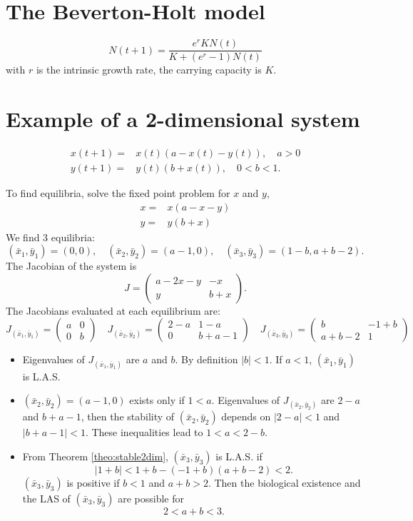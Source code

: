 \section{The Beverton-Holt model}
$$N(t+1)=\frac{ e ^r K N(t)}{K + (e^r -1)N(t)}$$
with $r$ is the intrinsic growth rate, the carrying capacity is $K$.

\section{Example of a 2-dimensional system}
\begin{equation*}
\begin{array}{cl}
x(t+1)=&x(t)(a-x(t)-y(t)), \quad a>0\\
y(t+1)=&y(t)(b+x(t)), \quad 0<b<1.
\end{array}
\end{equation*}


To find equilibria, solve the fixed point problem for $x$ and $y$,
\begin{equation*}
\begin{array}{cl}
x=&x(a-x-y)\\
y=&y(b+x)
\end{array}
\end{equation*}
We find 3 equilibria:
\[
(\bar x_1, \bar y_1)=(0,0), \quad  (\bar x_2, \bar y_2)=(a-1,0), \quad (\bar x_3, \bar y_3)=(1-b,a+b-2).
\]
The Jacobian of the system is
\[
J=\begin{pmatrix}
a-2x-y & -x \\
y & b+x
\end{pmatrix}.
\]
The Jacobians evaluated at each equilibrium are:
$$
J_{(\bar x_1, \bar y_1)}=\left ( 
\begin{array}{cc}
a & 0 \\
0 & b
\end{array}
\right ) \quad 
J_{(\bar x_2, \bar y_2)}=\left ( 
\begin{array}{cc}
2-a & 1-a \\
0 & b+a-1
\end{array}
\right ) \quad
J_{(\bar x_3, \bar y_3)}=\left ( 
\begin{array}{cc}
b & -1+b \\
a+b-2 & 1
\end{array}
\right )
$$
\begin{itemize}
\item Eigenvalues of $J_{(\bar x_1, \bar y_1)}$ are $a$ and $b$. By definition $|b|<1$. If $a<1$, $(\bar x_1, \bar y_1)$ is L.A.S.
\item $(\bar x_2, \bar y_2)=(a-1,0)$ exists only if $1<a$. Eigenvalues of $J_{(\bar x_2, \bar y_2)}$ are $2-a$ and $b+a-1$, then the stability of $(\bar x_2, \bar y_2)$ depends on $|2-a|<1$ and $|b+a-1|<1$. These inequalities lead to $1<a<2-b$.
\item From Theorem \ref{theo:stable2dim}, $(\bar x_3, \bar y_3)$ is L.A.S. if 
$$|1+b|<1+b-(-1+b)(a+b-2)<2.$$
$(\bar x_3, \bar y_3)$ is positive if $b<1$ and $a+b>2$. Then the biological existence and the LAS of $(\bar x_3, \bar y_3)$ are possible for
$$2<a+b<3.$$
\end{itemize}


